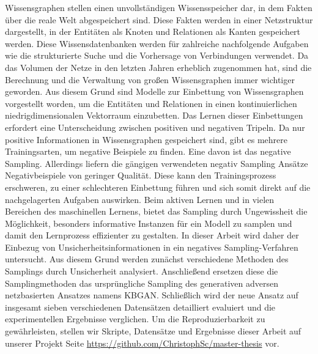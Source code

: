 Wissensgraphen stellen einen unvollständigen Wissensspeicher dar, in dem Fakten über die reale Welt abgespeichert sind.  
Diese Fakten werden in einer Netzstruktur dargestellt, in der Entitäten als Knoten und Relationen als Kanten gespeichert werden. 
Diese Wissensdatenbanken werden für zahlreiche nachfolgende Aufgaben wie die strukturierte Suche und die Vorhersage von Verbindungen verwendet.
Da das Volumen der Netze in den letzten Jahren erheblich zugenommen hat, sind die Berechnung und die Verwaltung von großen Wissensgraphen immer wichtiger geworden. 
Aus diesem Grund sind Modelle zur Einbettung von Wissensgraphen vorgestellt worden, um die Entitäten und Relationen in einen kontinuierlichen niedrigdimensionalen Vektorraum einzubetten. Das Lernen dieser Einbettungen erfordert eine Unterscheidung zwischen positiven und negativen Tripeln. 
Da nur positive Informationen in Wissensgraphen gespeichert sind, gibt es mehrere Trainingsarten, um negative Beispiele zu finden. 
Eine davon ist das negative Sampling. 
Allerdings liefern die gängigen verwendeten negativ Sampling Ansätze Negativbeispiele von geringer Qualität. 
Diese kann den Trainingsprozess erschweren, zu einer schlechteren Einbettung führen und sich somit direkt auf die nachgelagerten Aufgaben auswirken. 
Beim aktiven Lernen und in vielen Bereichen des maschinellen Lernens, bietet das Sampling durch Ungewissheit die Möglichkeit, besonders informative Instanzen für ein Modell zu samplen und damit den Lernprozess effizienter zu gestalten.
In dieser Arbeit wird daher der Einbezug von Unsicherheitsinformationen in ein negatives Sampling-Verfahren untersucht. 
Aus diesem Grund werden zunächst verschiedene Methoden des Samplings durch Unsicherheit analysiert. 
Anschließend ersetzen diese die Samplingmethoden das ursprüngliche Sampling des generativen adversen netzbasierten Ansatzes namens KBGAN. 
Schließlich wird der neue Ansatz auf insgesamt sieben verschiedenen Datensätzen detailliert evaluiert und die experimentellen Ergebnisse verglichen. 
Um die Reproduzierbarkeit zu gewährleisten, stellen wir Skripte, Datensätze und Ergebnisse dieser Arbeit auf unserer Projekt Seite \url{https://github.com/ChristophSc/master-thesis} vor.
